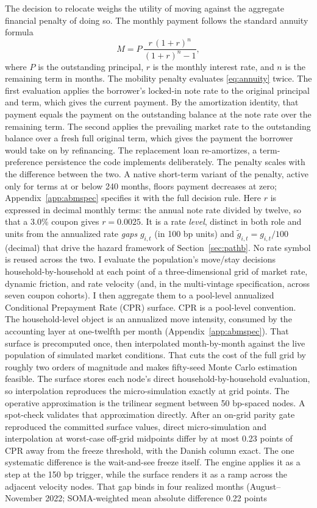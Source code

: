 \documentclass[12pt]{article}
\begin{document}
The decision to relocate weighs the utility of moving against the aggregate financial penalty of doing so. The monthly payment follows the standard annuity formula
\begin{equation}\label{eq:annuity}
M = P\,\frac{r\,(1+r)^{n}}{(1+r)^{n}-1},
\end{equation}
where $P$ is the outstanding principal, $r$ is the monthly interest rate, and $n$ is the remaining term in months. The mobility penalty evaluates \eqref{eq:annuity} twice. The first evaluation applies the borrower's locked-in note rate to the original principal and term, which gives the current payment. By the amortization identity, that payment equals the payment on the outstanding balance at the note rate over the remaining term. The second applies the prevailing market rate to the outstanding balance over a fresh full original term, which gives the payment the borrower would take on by refinancing. The replacement loan re-amortizes, a term-preference persistence the code implements deliberately. The penalty scales with the difference between the two. A native short-term variant of the penalty, active only for terms at or below 240 months, floors payment decreases at zero; Appendix~\ref{app:abmspec} specifies it with the full decision rule. Here $r$ is expressed in decimal monthly terms: the annual note rate divided by twelve, so that a 3.0\% coupon gives $r = 0.0025$. It is a rate \emph{level}, distinct in both role and units from the annualized rate \emph{gaps} $g_{i,t}$ (in 100 bp units) and $\tilde g_{i,t} = g_{i,t}/100$ (decimal) that drive the hazard framework of Section~\ref{sec:pathb}. No rate symbol is reused across the two. I evaluate the population's move/stay decisions household-by-household at each point of a three-dimensional grid of market rate, dynamic friction, and rate velocity (and, in the multi-vintage specification, across seven coupon cohorts). I then aggregate them to a pool-level annualized Conditional Prepayment Rate (CPR) surface. CPR is a pool-level convention. The household-level object is an annualized move intensity, consumed by the accounting layer at one-twelfth per month (Appendix~\ref{app:abmspec}). That surface is precomputed once, then interpolated month-by-month against the live population of simulated market conditions. That cuts the cost of the full grid by roughly two orders of magnitude and makes fifty-seed Monte Carlo estimation feasible. The surface stores each node's direct household-by-household evaluation, so interpolation reproduces the micro-simulation exactly at grid points. The operative approximation is the trilinear segment between 50 bp-spaced nodes. A spot-check validates that approximation directly. After an on-grid parity gate reproduced the committed surface values, direct micro-simulation and interpolation at worst-case off-grid midpoints differ by at most 0.23 points of CPR away from the freeze threshold, with the Danish column exact. The one systematic difference is the wait-and-see freeze itself. The engine applies it as a step at the 150 bp trigger, while the surface renders it as a ramp across the adjacent velocity nodes. That gap binds in four realized months (August--November 2022; SOMA-weighted mean absolute difference 0.22 points 
\end{document}
